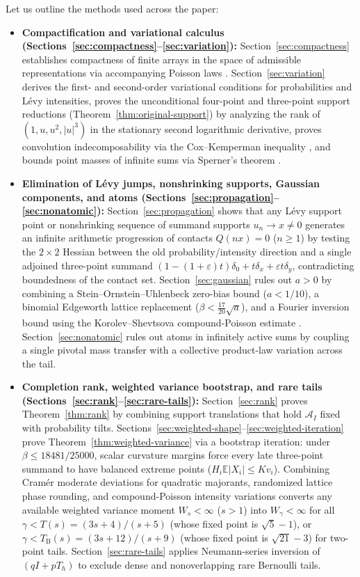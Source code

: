\documentclass[11pt]{article}
\numberwithin{equation}{section}
\theoremstyle{definition}
\newcommand{\E}{\mathbb E}
\newcommand{\eps}{\varepsilon}
\begin{document}
Let us outline the methods used across the paper:
\begin{itemize}[leftmargin=2em]
\item \textbf{Compactification and variational calculus
(Sections~\ref{sec:compactness}--\ref{sec:variation}):} Section~\ref{sec:compactness}
establishes compactness of finite arrays in the space of admissible
representations via accompanying Poisson laws \citep{Levy1937}.
Section~\ref{sec:variation} derives the first- and second-order variational
conditions for probabilities and L\'evy intensities, proves the unconditional
four-point and three-point support reductions (Theorem~\ref{thm:original-support})
by analyzing the rank of $(1,u,u^2,|u|^3)$ in the stationary second
logarithmic derivative, proves convolution indecomposability via the
Cox--Kemperman inequality \citep{CoxKemperman1983,Ruzankin2014}, and bounds
point masses of infinite sums via Sperner's theorem \citep{Sperner1928}.
\item \textbf{Elimination of L\'evy jumps, nonshrinking supports, Gaussian
components, and atoms (Sections~\ref{sec:propagation}--\ref{sec:nonatomic}):}
Section~\ref{sec:propagation} shows that any L\'evy support point or
nonshrinking sequence of summand supports $u_n\to x\ne0$ generates an
infinite arithmetic progression of contacts $Q(nx)=0$ ($n\ge1$) by testing
the $2\times2$ Hessian between the old probability/intensity direction and a
single adjoined three-point summand $(1-(1+\eps)t)\delta_0+t\delta_x+\eps t\delta_y$,
contradicting boundedness of the contact set. Section~\ref{sec:gaussian}
rules out $a>0$ by combining a Stein--Ornstein--Uhlenbeck zero-bias bound
($a<1/10$), a binomial Edgeworth lattice replacement ($\beta<\frac{17}{20}\sqrt a$),
and a Fourier inversion bound using the Korolev--Shevtsova compound-Poisson
estimate \citep{KorolevShevtsova2012}. Section~\ref{sec:nonatomic} rules out
atoms in infinitely active sums by coupling a single pivotal mass transfer
with a collective product-law variation across the tail.
\item \textbf{Completion rank, weighted variance bootstrap, and rare tails
(Sections~\ref{sec:rank}--\ref{sec:rare-tails}):} Section~\ref{sec:rank}
proves Theorem~\ref{thm:rank} by combining support translations that hold
$\mathcal A_I$ fixed with probability tilts. Sections~\ref{sec:weighted-shape}--\ref{sec:weighted-iteration}
prove Theorem~\ref{thm:weighted-variance} via a bootstrap iteration: under
$\beta\le18481/25000$, scalar curvature margins force every late three-point
summand to have balanced extreme points ($H_i\E|X_i|\le Kv_i$). Combining
Cram\'er moderate deviations for quadratic majorants, randomized lattice
phase rounding, and compound-Poisson intensity variations converts any
available weighted variance moment $W_s<\infty$ ($s>1$) into $W_\gamma<\infty$
for all $\gamma<T(s)=(3s+4)/(s+5)$ (whose fixed point is $\sqrt5-1$), or
$\gamma<T_{\mathrm B}(s)=(3s+12)/(s+9)$ (whose fixed point is $\sqrt{21}-3$)
for two-point tails. Section~\ref{sec:rare-tails} applies Neumann-series
inversion of $(qI+pT_h)$ to exclude dense and nonoverlapping rare Bernoulli
tails.
\end{itemize}
\end{document}
